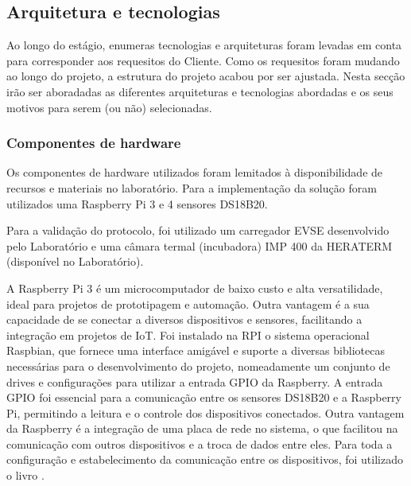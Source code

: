     

\subsection{Arquitetura e tecnologias}

Ao longo do estágio, enumeras tecnologias e arquiteturas foram levadas em conta para corresponder aos requesitos do Cliente. Como os requesitos foram mudando ao longo do projeto, a estrutura do projeto acabou por ser ajustada.
Nesta secção irão ser aboradadas as diferentes arquiteturas e tecnologias abordadas e os seus motivos para serem (ou não) selecionadas.

\subsubsection{Componentes de hardware}
Os componentes de hardware utilizados foram lemitados à disponibilidade de recursos e materiais no laboratório. Para a implementação da solução foram
utilizados uma Raspberry Pi 3 e 4 sensores DS18B20.

Para a validação do protocolo, foi utilizado um carregador EVSE desenvolvido pelo Laboratório e uma câmara termal (incubadora) IMP 400 da HERATERM 
(disponível no Laboratório).

A Raspberry Pi 3 é um microcomputador de baixo custo e alta versatilidade, ideal para projetos de prototipagem e automação. Outra vantagem é a sua capacidade de se conectar a diversos dispositivos e sensores, facilitando a integração em projetos de IoT.
Foi instalado na RPI o sistema operacional Raspbian, que fornece uma interface amigável e suporte a diversas bibliotecas necessárias para o desenvolvimento do projeto, nomeadamente um conjunto de drives e configurações para utilizar a entrada GPIO da Raspberry.
A entrada GPIO foi essencial para a comunicação entre os sensores DS18B20 e a Raspberry Pi, permitindo a leitura e o controle dos dispositivos conectados. 
Outra vantagem da Raspberry é a integração de uma placa de rede no sistema, o que facilitou na comunicação com outros dispositivos e a troca de dados entre eles.
Para toda a configuração e estabelecimento da comunicação entre os dispositivos, foi utilizado o livro \cite{Molloy_2016}.

